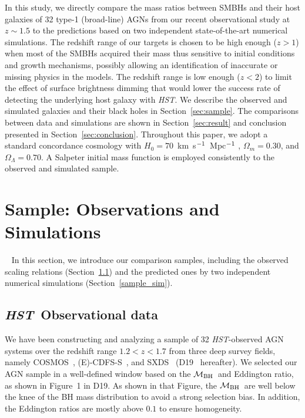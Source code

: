 \documentclass[twocolumn,trackchanges]{aastex63}
\newcommand{\hst}{{\it HST}}
\newcommand{\mbh}{$\mathcal M_{\rm BH}$}
\newcommand{\kmsMpc}{km~s$^{\rm -1}$~Mpc$^{\rm -1}$}
\newcommand{\blue}[1]{{{#1}}}
\newcommand{\pink}[1]{{{#1}}}
\begin{document}
\blue{
In this study, we directly compare the mass ratios between SMBHs and their host galaxies of 32 type-1 (broad-line) AGNs from our recent observational study at $z\sim1.5$ \citep{Ding2019} to the predictions based on two independent state-of-the-art numerical simulations.} The redshift range of our targets is chosen to be high enough ($z>1$) when most of the SMBHs acquired their mass thus sensitive to initial
conditions and growth mechanisms, possibly allowing an identification of inaccurate or missing physics in the models. The redshift range is low enough ($z<2$) to limit the effect of surface brightness dimming that would lower the success rate of detecting the underlying host galaxy with \hst. We describe the observed and simulated galaxies and their black holes in Section~\ref{sec:sample}. The comparisons between data and simulations are shown in Section~\ref{sec:result} and conclusion presented in Section~\ref{sec:conclusion}. Throughout this paper, we adopt a standard concordance
cosmology with $H_0 = 70$~\kmsMpc
, $\Omega_m = 0.30$,
and $\Omega_\Lambda = 0.70$. A Salpeter initial mass function is employed consistently to the
observed and simulated sample.


\pink{
\section{Sample: Observations and Simulations}~\label{sec:sample}
In this section, we introduce our comparison samples, including the observed scaling relations (Section~\ref{hst_sample}) and the predicted ones by two independent numerical simulations (Section~\ref{sample_sim}).}
	
\subsection{\hst\ Observational data}\label{hst_sample}
	
We have been constructing and analyzing a sample of 32 \hst-observed AGN systems over the redshift range $1.2<z<1.7$ from three deep survey fields, namely COSMOS~\citep{Civano2016}, (E)-CDFS-S~\citep{Lehmer2005, Xue2011}, and SXDS~\citep{Ueda2008} (D19~\citep{Ding2019} hereafter).
We selected our AGN sample in a well-defined window based on the \mbh\ and Eddington ratio, as shown in Figure~1 in D19. As shown in that Figure, the \mbh\ are well below the knee of the BH mass distribution to avoid a strong selection bias. In addition, the Eddington ratios are mostly above $0.1$ to ensure homogeneity.
\end{document}
